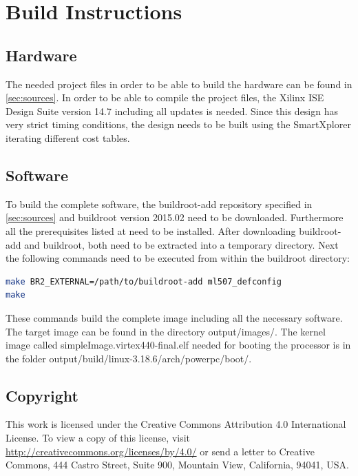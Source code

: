 \documentclass[12pt,a4paper,parskip=full,abstract=true,BCOR=12mm,twoside,open=right]{scrreprt}
\begin{document}
\chapter{Build Instructions}
\endgroup
\section{Hardware}
\label{sec:build:hw}

The needed project files in order to be able to build the hardware can be found
in \cref{sec:sources}. In order to be able to compile the project files, the
Xilinx ISE Design Suite version 14.7 including all updates is needed. Since
this design has very strict timing conditions, the design needs to be built
using the SmartXplorer iterating different cost tables.

\section{Software}
\label{sec:build:sw}

To build the complete software, the buildroot-add repository specified in
\cref{sec:sources} and buildroot version 2015.02 \cite{buildroot} need to be downloaded. Furthermore
all the prerequisites listed at \cite{buildroot} need to be installed. After
downloading buildroot-add and buildroot, both need to be extracted into a temporary directory. Next
the following commands need to be executed from within the buildroot directory:

\begin{lstlisting}[language=sh]
make BR2_EXTERNAL=/path/to/buildroot-add ml507_defconfig
make
\end{lstlisting}

These commands build the complete image including all the necessary software. The target image
can be found in the directory {\ttfamily output/images/}. The kernel image called {\ttfamily simpleImage.virtex440-final.elf} needed for booting
the processor is in the folder {\ttfamily output/build/linux-3.18.6/arch/powerpc/boot/}.




\section*{Copyright}
This work is licensed under the Creative Commons Attribution 4.0 International
License. To view a copy of this license, visit
\url{http://creativecommons.org/licenses/by/4.0/} or send a letter to Creative
Commons, 444 Castro Street, Suite 900, Mountain View, California, 94041, USA.
\end{document}
